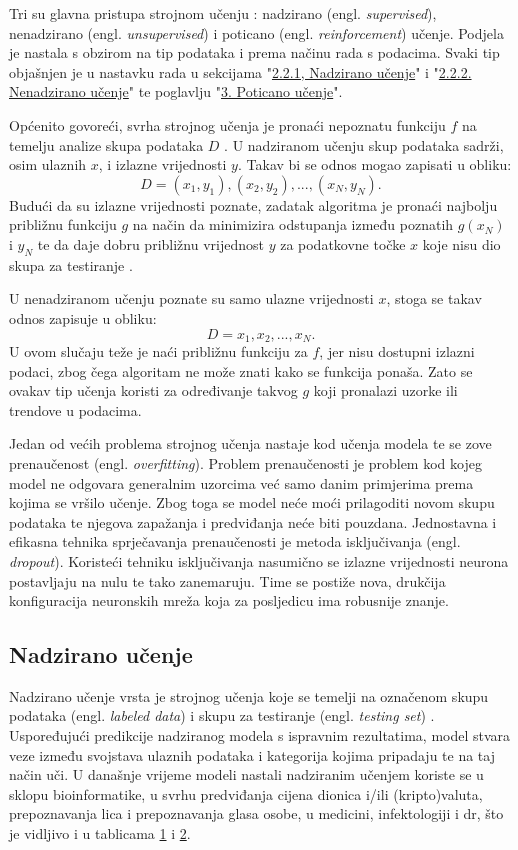 \documentclass[]{foi} %
\begin{document}
Tri su glavna pristupa strojnom učenju \cite[str. 671]{AIModernApproach}: nadzirano (engl. \textit{supervised}), nenadzirano (engl. \textit{unsupervised}) i poticano (engl. \textit{reinforcement}) učenje. Podjela je nastala s obzirom na tip podataka i prema načinu rada s podacima. Svaki tip objašnjen je u nastavku rada u sekcijama "\hyperref[sub:Nadzirano]{2.2.1, Nadzirano učenje}" i "\hyperref[sub:Nenadzirano]{2.2.2. Nenadzirano učenje}" te poglavlju "\hyperref[cha:Poticano]{3. Poticano učenje}".

Općenito govoreći, svrha strojnog učenja je pronaći nepoznatu funkciju $f$ na temelju analize skupa podataka $D$ \cite{mlFormule}. U nadziranom učenju skup podataka sadrži, osim ulaznih $x$, i izlazne vrijednosti $y$. Takav bi se odnos mogao zapisati u obliku: \[D = {(x_1, y_1), (x_2, y_2), ..., (x_N, y_N)}.\] Budući da su izlazne vrijednosti poznate, zadatak algoritma je pronaći najbolju približnu funkciju $g$ na način da minimizira odstupanja između poznatih $g(x_N)$ i $y_N$ te da daje dobru približnu vrijednost $y$ za podatkovne točke $x$ koje nisu dio skupa za testiranje \cite{mlFormule}.

U nenadziranom učenju poznate su samo ulazne vrijednosti $x$, stoga se takav odnos zapisuje u obliku: \[D = {x_1, x_2, ..., x_N}.\] U ovom slučaju teže je naći približnu funkciju za $f$, jer nisu dostupni izlazni podaci, zbog čega algoritam ne može znati kako se funkcija ponaša. Zato se ovakav tip učenja koristi za određivanje takvog $g$ koji pronalazi uzorke ili trendove u podacima. \cite{mlFormule}

Jedan od većih problema strojnog učenja nastaje kod učenja modela te se zove prenaučenost (engl. \textit{overfitting}). Problem prenaučenosti je problem kod kojeg model ne odgovara generalnim uzorcima već samo danim primjerima prema kojima se vršilo učenje. Zbog toga se model neće moći prilagoditi novom skupu podataka te njegova zapažanja i predviđanja neće biti pouzdana. Jednostavna i efikasna tehnika sprječavanja prenaučenosti je metoda isključivanja (engl. \textit{dropout}). Koristeći tehniku isključivanja nasumično se izlazne vrijednosti neurona postavljaju na nulu te tako zanemaruju. Time se postiže nova, drukčija konfiguracija neuronskih mreža koja za posljedicu ima robusnije znanje.

\subsection{Nadzirano učenje}
\label{sub:Nadzirano}
Nadzirano učenje vrsta je strojnog učenja koje se temelji na označenom skupu podataka (engl. \textit{labeled data}) i skupu za testiranje (engl. \textit{testing set}) \cite{MLGrafovi}. Uspoređujući predikcije nadziranog modela s ispravnim rezultatima, model stvara veze između svojstava ulaznih podataka i kategorija kojima pripadaju te na taj način uči. U današnje vrijeme modeli nastali nadziranim učenjem koriste se u sklopu bioinformatike, u svrhu predviđanja cijena dionica i/ili (kripto)valuta, prepoznavanja lica i prepoznavanja glasa osobe, u medicini, infektologiji i dr, što je vidljivo i u tablicama \hyperref[tab:Tablica 1]{1} i \hyperref[tab:Tablica 2]{2}.
\end{document}
